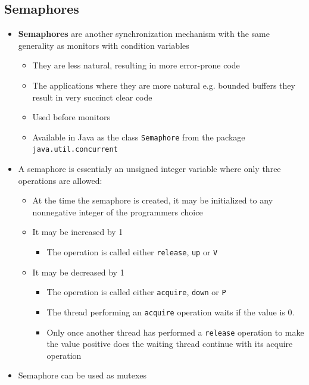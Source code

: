 \documentclass[11pt]{article}
\providecommand{\tightlist}{%
      \setlength{\itemsep}{0pt}\setlength{\parskip}{0pt}}
\begin{document}
    \subsection{Semaphores}\label{semaphores}

\begin{itemize}
\tightlist
\item
  \textbf{Semaphores} are another synchronization mechanism with the
  same generality as monitors with condition variables

  \begin{itemize}
  \tightlist
  \item
    They are less natural, resulting in more error-prone code
  \item
    The applications where they are more natural e.g. bounded buffers
    they result in very succinct clear code
  \item
    Used before monitors
  \item
    Available in Java as the class \texttt{Semaphore} from the package
    \texttt{java.util.concurrent}
  \end{itemize}
\item
  A semaphore is essentialy an unsigned integer variable where only
  three operations are allowed:

  \begin{itemize}
  \tightlist
  \item
    At the time the semaphore is created, it may be initialized to any
    nonnegative integer of the programmers choice
  \item
    It may be increased by 1

    \begin{itemize}
    \tightlist
    \item
      The operation is called either \texttt{release}, \texttt{up} or
      \texttt{V}
    \end{itemize}
  \item
    It may be decreased by 1

    \begin{itemize}
    \tightlist
    \item
      The operation is called either \texttt{acquire}, \texttt{down} or
      \texttt{P}
    \item
      The thread performing an \texttt{acquire} operation waits if the
      value is 0.
    \item
      Only once another thread has performed a \texttt{release}
      operation to make the value positive does the waiting thread
      continue with its acquire operation
    \end{itemize}
  \end{itemize}
\item
  Semaphore can be used as mutexes


\end{itemize}
\end{document}
